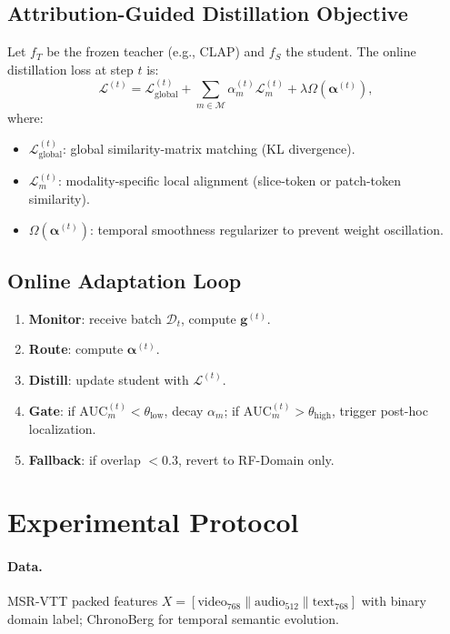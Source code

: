 \documentclass[11pt]{article}
\begin{document}
\subsection{Attribution-Guided Distillation Objective}

Let \(f_T\) be the frozen teacher (e.g., CLAP) and \(f_S\) the student. The online distillation loss at step \(t\) is:
\begin{equation}
    \mathcal{L}^{(t)} = \mathcal{L}_{\text{global}}^{(t)} + \sum_{m \in \mathcal{M}} \alpha_m^{(t)} \mathcal{L}_m^{(t)} + \lambda \Omega(\boldsymbol{\alpha}^{(t)}),
\end{equation}
where:
\begin{itemize}
    \item \(\mathcal{L}_{\text{global}}^{(t)}\): global similarity-matrix matching (KL divergence).
    \item \(\mathcal{L}_m^{(t)}\): modality-specific local alignment (slice-token or patch-token similarity).
    \item \(\Omega(\boldsymbol{\alpha}^{(t)})\): temporal smoothness regularizer to prevent weight oscillation.
\end{itemize}

\subsection{Online Adaptation Loop}
\begin{enumerate}
    \item \textbf{Monitor}: receive batch \(\mathcal{D}_t\), compute \(\mathbf{g}^{(t)}\).
    \item \textbf{Route}: compute \(\boldsymbol{\alpha}^{(t)}\).
    \item \textbf{Distill}: update student with \(\mathcal{L}^{(t)}\).
    \item \textbf{Gate}: if \(\text{AUC}_m^{(t)} < \theta_{\text{low}}\), decay \(\alpha_m\); if \(\text{AUC}_m^{(t)} > \theta_{\text{high}}\), trigger post-hoc localization.
    \item \textbf{Fallback}: if overlap \(< 0.3\), revert to RF-Domain only.
\end{enumerate}

\section{Experimental Protocol}
\label{sec:exp}

\paragraph{Data.} MSR-VTT packed features \(X=[\mathrm{video}_{768}\|\mathrm{audio}_{512}\|\mathrm{text}_{768}]\) with binary domain label; ChronoBerg for temporal semantic evolution.
\end{document}
